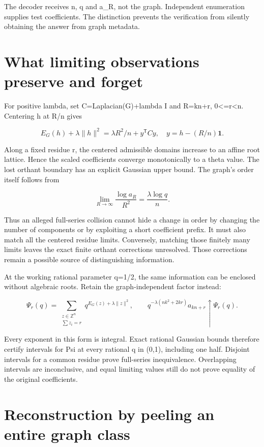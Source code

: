 \documentclass[
  11pt,
  a4paper,
]{report}
\begin{document}
The decoder receives n, q and a\_R, not the graph. Independent
enumeration supplies test coefficients. The distinction prevents the
verification from silently obtaining the answer from graph metadata.

\hypertarget{what-limiting-observations-preserve-and-forget}{%
\section{What limiting observations preserve and
forget}\label{what-limiting-observations-preserve-and-forget}}

For positive lambda, set C=Laplacian(G)+lambda I and R=kn+r,
0\textless=r\textless n. Centering h at R/n gives

\[
 E_G(h)+\lambda\|h\|^2
 =\lambda R^2/n+y^{\mathsf T}Cy,
 \quad y=h-(R/n)\mathbf1.
\]

Along a fixed residue r, the centered admissible domains increase to an
affine root lattice. Hence the scaled coefficients converge
monotonically to a theta value. The lost orthant boundary has an
explicit Gaussian upper bound. The graph's order itself follows from

\[
 \lim_{R\to\infty}\frac{\log a_R}{R^2}
 =\frac{\lambda\log q}{n}.
\]

Thus an alleged full-series collision cannot hide a change in order by
changing the number of components or by exploiting a short coefficient
prefix. It must also match all the centered residue limits. Conversely,
matching those finitely many limits leaves the exact finite orthant
corrections unresolved. Those corrections remain a possible source of
distinguishing information.

At the working rational parameter q=1/2, the same information can be
enclosed without algebraic roots. Retain the graph-independent factor
instead:

\[
 \Psi_r(q)=\sum_{\substack{z\in\mathbb Z^n\\\sum z_i=r}}
 q^{E_G(z)+\lambda\|z\|^2},\qquad
 q^{-\lambda(nk^2+2kr)}a_{kn+r}\uparrow\Psi_r(q).
\]

Every exponent in this form is integral. Exact rational Gaussian bounds
therefore certify intervals for Psi at every rational q in (0,1),
including one half. Disjoint intervals for a common residue prove
full-series inequivalence. Overlapping intervals are inconclusive, and
equal limiting values still do not prove equality of the original
coefficients.

\hypertarget{reconstruction-by-peeling-an-entire-graph-class}{%
\section{Reconstruction by peeling an entire graph
class}\label{reconstruction-by-peeling-an-entire-graph-class}}
\end{document}
